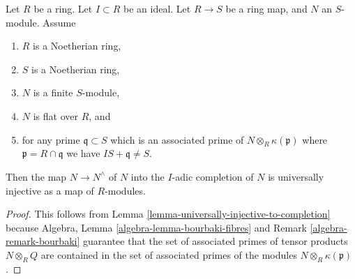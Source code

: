 \begin{lemma}
\label{lemma-universally-injective-to-completion-flat}
Let $R$ be a ring.
Let $I \subset R$ be an ideal.
Let $R \to S$ be a ring map, and $N$ an $S$-module.
Assume
\begin{enumerate}
\item $R$ is a Noetherian ring,
\item $S$ is a Noetherian ring,
\item $N$ is a finite $S$-module,
\item $N$ is flat over $R$, and
\item for any prime $\mathfrak q \subset S$ which is an associated prime of
$N \otimes_R \kappa(\mathfrak p)$ where $\mathfrak p = R \cap \mathfrak q$
we have $IS + \mathfrak q \not = S$.
\end{enumerate}
Then the map $N \to N^\wedge$ of $N$ into the $I$-adic completion of $N$
is universally injective as a map of $R$-modules.
\end{lemma}

\begin{proof}
This follows from
Lemma \ref{lemma-universally-injective-to-completion}
because
Algebra, Lemma
\ref{algebra-lemma-bourbaki-fibres} and
Remark \ref{algebra-remark-bourbaki}
guarantee that the set of associated primes of tensor products
$N \otimes_R Q$ are contained in the set of associated primes of
the modules $N \otimes_R \kappa(\mathfrak p)$.
\end{proof}
